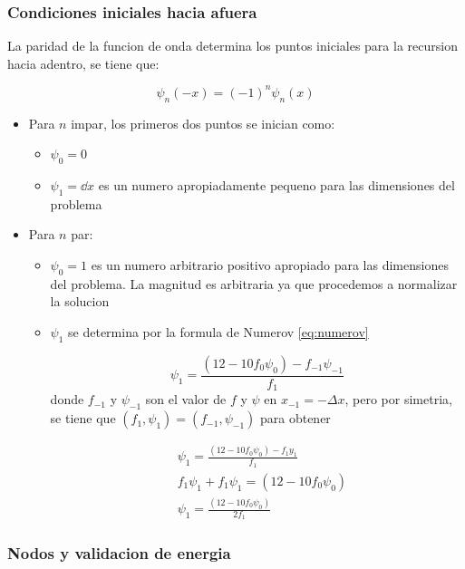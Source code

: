 \documentclass[11pt]{article}
\begin{document}
\subsubsection{Condiciones iniciales hacia afuera}
\label{sec:orgc142546}

La paridad de la funcion de onda determina los puntos iniciales para la recursion hacia adentro, se tiene que:

\[ \psi_n(-x) = (-1)^n\psi_n(x) \]

\begin{itemize}
\item Para \(n\) impar, los primeros dos puntos se inician como:
\begin{itemize}
\item \(\psi_0 = 0\)
\item \(\psi_1 = \dd{x}\) es un numero apropiadamente pequeno para las dimensiones del problema
\end{itemize}

\item Para \(n\) par:
\begin{itemize}
\item \(\psi_0 = 1\) es un numero arbitrario positivo apropiado para las dimensiones del problema. La magnitud es arbitraria ya que procedemos a normalizar la solucion

\item \(\psi_1\) se determina por la formula de Numerov \ref{eq:numerov}

\[ \psi_1 = \frac{(12 - 10 f_0\psi_0)-f_{-1}\psi_{-1}}{f_1} \]
donde \(f_{-1}\) y \(\psi_{-1}\) son el valor de \(f\) y \(\psi\) en \(x_{-1} = - \Delta x\), pero por simetria, se tiene que \((f_1,\psi_1) = (f_{-1},\psi_{-1})\) para obtener

\begin{align*}
    &\psi_1 = \frac{(12 - 10f_0\psi_0) - f_1y_1}{f_1} \\
    &f_1\psi_1 + f_1\psi_1 = (12 - 10f_0\psi_0) \\
    &\psi_1 = \frac{(12 - 10f_0\psi_0)}{2f_1}
\end{align*}
\end{itemize}
\end{itemize}
\subsubsection{Nodos y validacion de energia}
\label{sec:org48cef7a}
\end{document}
